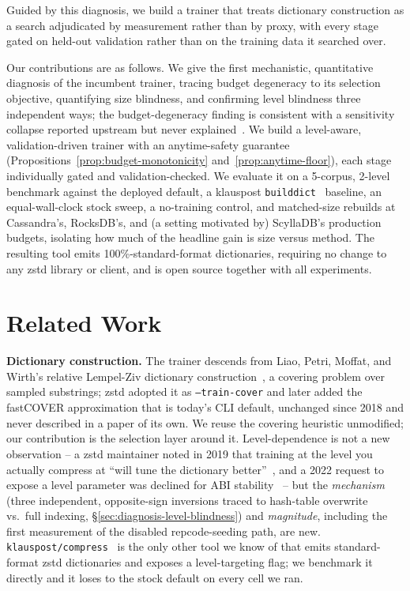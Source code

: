 \documentclass[12pt]{article}
\begin{document}
Guided by this diagnosis, we build a trainer that treats dictionary
construction as a search adjudicated by measurement rather than by
proxy, with every stage gated on held-out validation rather than on the
training data it searched over.

Our contributions are as follows. We give the first mechanistic,
quantitative diagnosis of the incumbent trainer, tracing budget
degeneracy to its selection objective, quantifying size blindness, and
confirming level blindness three independent ways; the budget-degeneracy
finding is consistent with a sensitivity collapse reported upstream but
never explained~\cite{zstdissue4127}. We build a level-aware,
validation-driven trainer with an anytime-safety guarantee
(Propositions~\ref{prop:budget-monotonicity} and~\ref{prop:anytime-floor}),
each stage individually gated and validation-checked. We evaluate it on
a 5-corpus, 2-level benchmark against the deployed default, a klauspost
\texttt{builddict}~\cite{klauspost} baseline, an equal-wall-clock stock
sweep, a no-training control, and matched-size rebuilds at Cassandra's,
RocksDB's, and (a setting motivated by) ScyllaDB's production budgets,
isolating how much of the headline gain is size versus method. The
resulting tool emits 100\%-standard-format dictionaries, requiring no
change to any zstd library or client, and is open source together with
all experiments.

\section{Related Work}
\label{sec:related-work}

\textbf{Dictionary construction.} The trainer descends from Liao,
Petri, Moffat, and Wirth's relative Lempel-Ziv dictionary
construction~\cite{liao2016cover}, a covering problem over sampled
substrings; zstd adopted it as \texttt{--train-cover} and later added
the fastCOVER approximation that is today's CLI default, unchanged
since 2018 and never described in a paper of its own. We reuse the
covering heuristic unmodified; our contribution is the selection layer
around it. Level-dependence is not a new observation -- a zstd
maintainer noted in 2019 that training at the level you actually
compress at ``will tune the dictionary better''~\cite{zstdissue1572},
and a 2022 request to expose a level parameter was declined for ABI
stability~\cite{zstdissue3213} -- but the \emph{mechanism} (three
independent, opposite-sign inversions traced to hash-table overwrite
vs.\ full indexing, \S\ref{sec:diagnosis-level-blindness}) and
\emph{magnitude}, including the first measurement of the disabled
repcode-seeding path, are new. \texttt{klauspost/compress}~\cite{klauspost}
is the only other tool we know of that emits standard-format zstd
dictionaries and exposes a level-targeting flag; we benchmark it
directly and it loses to the stock default on every cell we ran.
\end{document}
